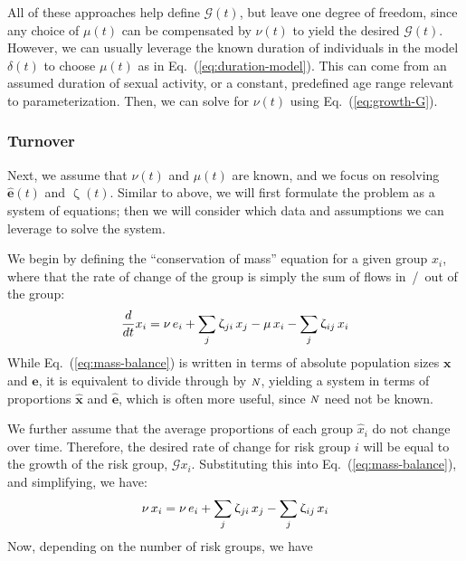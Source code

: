 \documentclass[10pt]{article}
\numberwithin{equation}{section}
\renewcommand{\zeta}{\upzeta}
\newcommand{\N}{{\mbox{\footnotesize{\textit{N}}}}}
\newcommand{\eq}[1]{Eq.~(\ref{#1})}
\begin{document}
All of these approaches help define $\mathcal{G}(t)$, but leave one degree of freedom,
since any choice of $\mu(t)$ can be compensated by $\nu(t)$ to yield the desired $\mathcal{G}(t)$.
However, we can usually leverage the known duration of individuals in the model $\delta(t)$
to choose $\mu(t)$ as in \eq{eq:duration-model}.
This can come from an assumed duration of sexual activity,
or a constant, predefined age range relevant to parameterization.
Then, we can solve for $\nu(t)$ using \eq{eq:growth-G}.
\subsubsection{Turnover}\label{sss:params-turnover}
Next, we assume that $\nu(t)$ and $\mu(t)$ are known,
and we focus on resolving $\bm{\hat{e}}(t)$ and $\zeta(t)$.
Similar to above, we will first formulate the problem as a system of equations;
then we will consider which data and assumptions we can leverage to solve the system.
\par
We begin by defining the ``conservation of mass'' equation for a given group $x_i$,
where that the rate of change of the group
is simply the sum of flows in~/~out of the group:
\begin{equation}\label{eq:mass-balance}
\frac{d}{dt}x_i
= \nu \thinspace e_i + \sum_{j}{\zeta_{ji} \thinspace x_j}
- \mu \thinspace x_i - \sum_{j}{\zeta_{ij} \thinspace x_i}
\end{equation}
While \eq{eq:mass-balance} is written in terms of
absolute population sizes $\bm{x}$ and $\bm{e}$,
it is equivalent to divide through by $\N$, yielding a system in terms of
proportions $\bm{\hat{x}}$ and $\bm{\hat{e}}$,
which is often more useful, since $\N$ need not be known.
\par
We further assume that the average proportions of each group $\hat{x}_i$ do not change over time.
Therefore, the desired rate of change for risk group $i$
will be equal to the growth of the risk group, $\mathcal{G} x_i$.
Substituting this into \eq{eq:mass-balance},
and simplifying, we have:
\begin{equation}\label{eq:system}
\nu \thinspace x_i
= \nu \thinspace e_i + \sum_{j}{\zeta_{ji} \thinspace x_j}
- \sum_{j}{\zeta_{ij} \thinspace x_i}
\end{equation}
Now, depending on the number of risk groups, we have
\end{document}
